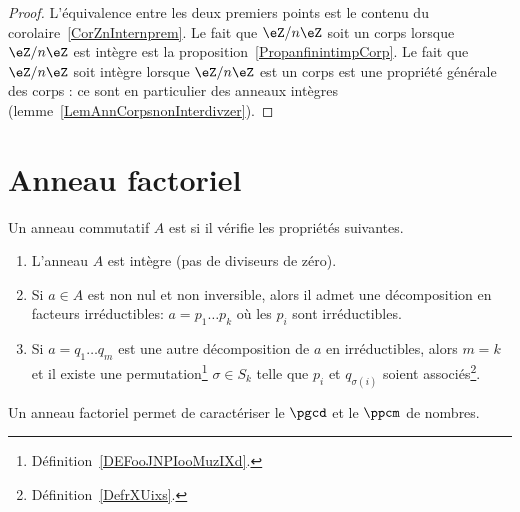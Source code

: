 \begin{proof}
	L'équivalence entre les deux premiers points est le contenu du corolaire~\ref{CorZnInternprem}. Le fait que \( \eZ/n\eZ\) soit un corps lorsque \( \eZ/n\eZ\) est intègre est la proposition~\ref{PropanfinintimpCorp}. Le fait que \( \eZ/n\eZ\) soit intègre lorsque \( \eZ/n\eZ\) est un corps est une propriété générale des corps : ce sont en particulier des anneaux intègres (lemme~\ref{LemAnnCorpsnonInterdivzer}).
\end{proof}



\section{Anneau factoriel}

\begin{definition}        \label{DEFooVCATooPJGWKq}
	Un anneau commutatif \( A\) est  si il vérifie les propriétés suivantes.
	\begin{enumerate}
		\item
		      L'anneau \( A\) est intègre (pas de diviseurs de zéro).
		\item
		      Si \( a\in A\) est non nul et non inversible, alors il admet une décomposition en facteurs irréductibles: \( a=p_1\ldots p_k\) où les \( p_i\) sont irréductibles.
		\item
		      Si \( a=q_1\ldots q_m\) est une autre décomposition de \( a\) en irréductibles, alors \( m=k\) et il existe une permutation\footnote{Définition~\ref{DEFooJNPIooMuzIXd}.} \( \sigma\in S_k\) telle que \( p_i\) et \( q_{\sigma(i)}\) soient associés\footnote{Définition~\ref{DefrXUixs}.}.
	\end{enumerate}
\end{definition}

Un anneau factoriel permet de caractériser le \( \pgcd\) et le \( \ppcm\) de nombres.


